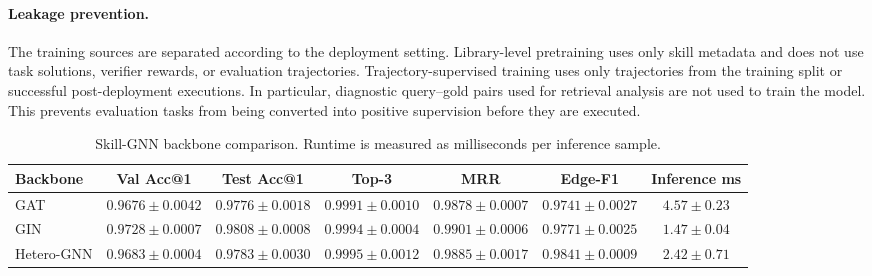 \documentclass[letterpaper]{article}
\begin{document}
\paragraph{Leakage prevention.}
The training sources are separated according to the deployment setting.
Library-level pretraining uses only skill metadata and does not use task
solutions, verifier rewards, or evaluation trajectories. Trajectory-supervised
training uses only trajectories from the training split or successful
post-deployment executions. In particular, diagnostic query--gold pairs used for
retrieval analysis are not used to train the model. This prevents evaluation
tasks from being converted into positive supervision before they are executed.
\begin{table}[t]
\centering
\small
\begin{tabular}{lcccccc}
\toprule
Backbone & Val Acc@1 & Test Acc@1 & Top-3 & MRR & Edge-F1 & Inference ms \\
\midrule
GAT &
$0.9676{\pm}0.0042$ &
$0.9776{\pm}0.0018$ &
$0.9991{\pm}0.0010$ &
$0.9878{\pm}0.0007$ &
$0.9741{\pm}0.0027$ &
$4.57{\pm}0.23$ \\
GIN &
$\mathbf{0.9728{\pm}0.0007}$ &
$\mathbf{0.9808{\pm}0.0008}$ &
$0.9994{\pm}0.0004$ &
$\mathbf{0.9901{\pm}0.0006}$ &
$0.9771{\pm}0.0025$ &
$\mathbf{1.47{\pm}0.04}$ \\
Hetero-GNN &
$0.9683{\pm}0.0004$ &
$0.9783{\pm}0.0030$ &
$\mathbf{0.9995{\pm}0.0012}$ &
$0.9885{\pm}0.0017$ &
$\mathbf{0.9841{\pm}0.0009}$ &
$2.42{\pm}0.71$ \\
\bottomrule
\end{tabular}
\caption{Skill-GNN backbone comparison. Runtime is measured as milliseconds per inference sample.}
\label{tab:gnn-backbone}
\end{table}
\end{document}
